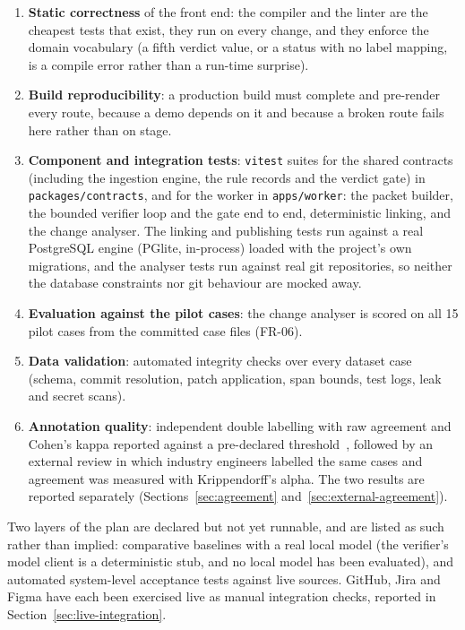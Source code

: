 \begin{enumerate}
  \item \textbf{Static correctness} of the front end: the compiler and the linter
        are the cheapest tests that exist, they run on every change, and they
        enforce the domain vocabulary (a fifth verdict value, or a status with no
        label mapping, is a compile error rather than a run-time surprise).
  \item \textbf{Build reproducibility}: a production build must complete and
        pre-render every route, because a demo depends on it and because a
        broken route fails here rather than on stage.
  \item \textbf{Component and integration tests}: \texttt{vitest} suites for
        the shared contracts (including the ingestion engine, the rule records
        and the verdict gate) in \texttt{packages/\allowbreak{}contracts}, and
        for the worker in \texttt{apps/\allowbreak{}worker}: the packet builder,
        the bounded verifier loop and the gate end to end, deterministic
        linking, and the change analyser. The linking and publishing tests run
        against a real PostgreSQL engine (PGlite, in-process) loaded with the
        project's own migrations, and the analyser tests run against real git
        repositories, so neither the database constraints nor git behaviour are
        mocked away.
  \item \textbf{Evaluation against the pilot cases}: the change analyser is
        scored on all 15 pilot cases from the committed case files (FR-06).
  \item \textbf{Data validation}: automated integrity checks over every dataset
        case (schema, commit resolution, patch application, span bounds, test
        logs, leak and secret scans).
  \item \textbf{Annotation quality}: independent double labelling with raw
        agreement and Cohen's kappa reported against a pre-declared
        threshold~\cite{cohen1960}, followed by an external review in which
        industry engineers labelled the same cases and agreement was measured
        with Krippendorff's alpha. The two results are reported separately
        (Sections~\ref{sec:agreement} and~\ref{sec:external-agreement}).
\end{enumerate}

Two layers of the plan are declared but not yet runnable, and are listed as
such rather than implied: comparative baselines with a real local model (the
verifier's model client is a deterministic stub, and no local model has been
evaluated), and automated system-level acceptance tests against live sources.
GitHub, Jira and Figma have each been exercised live as manual integration
checks, reported in Section~\ref{sec:live-integration}.

